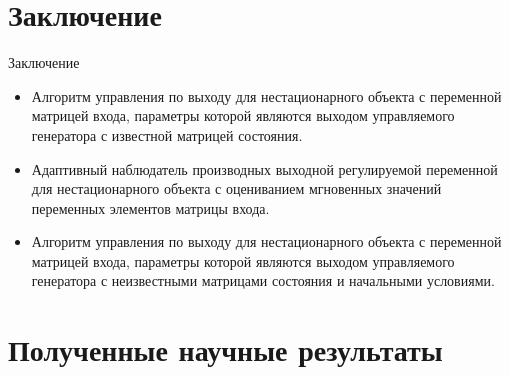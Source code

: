 \documentclass[10pt,aspectratio=169]{beamer}
\begin{document}
	\section{Заключение}
	\begin{frame}{Заключение}
		\hypertarget{slide\insertframenumber}{}
		\begin{itemize}
			\item Алгоритм управления по выходу для нестационарного объекта с переменной матрицей входа, параметры которой являются выходом управляемого генератора с известной матрицей состояния.
			\vspace*{2mm}
			\item  Адаптивный наблюдатель производных выходной регулируемой переменной для нестационарного объекта с оцениванием мгновенных значений переменных элементов матрицы входа.
			\vspace*{2mm}
			\item Алгоритм управления по выходу для нестационарного объекта с переменной матрицей входа, параметры которой являются выходом управляемого генератора с неизвестными матрицами состояния и начальными условиями.
		\end{itemize}
	\end{frame}
	
	\section{Полученные научные результаты}
	\printPapers
	\printConferenceRU
	\insertpagethanks
	
	
\end{document}
